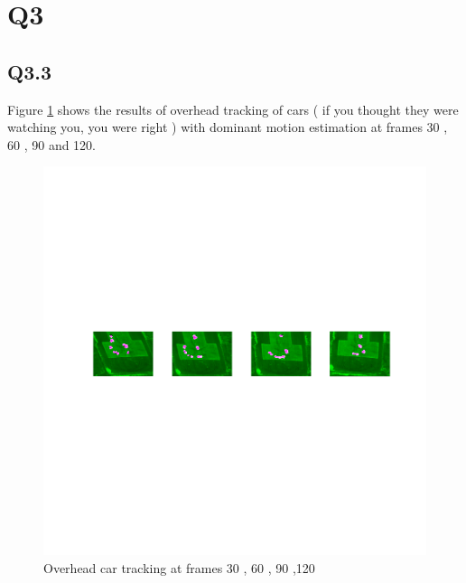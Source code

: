 \documentclass[12pt]{article}
\begin{document}
\section{Q3}
\subsection{Q3.3}
Figure \ref{fig:aerial} shows the results of overhead tracking of cars ( if you thought they were watching you, you were right ) with dominant motion estimation at frames 30 , 60 , 90 and 120.
\begin{figure}[H]
\centering
\includegraphics[page=1,width=1.0\textwidth]{q33_cars}
\caption{ Overhead car tracking at frames 30 , 60 , 90 ,120 }
\label{fig:aerial}
\end{figure}   
\end{document}
